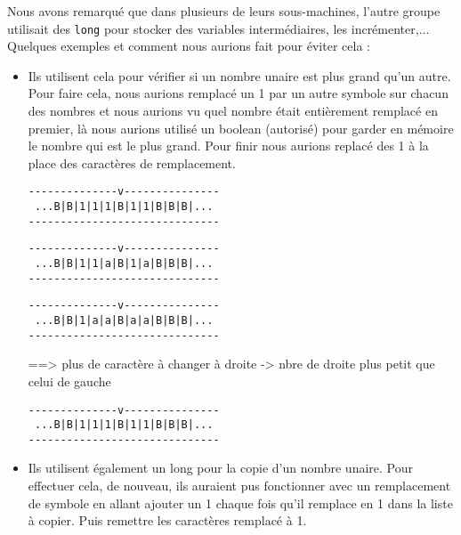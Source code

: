 \documentclass[a4paper,11pt]{article}
\begin{document}
Nous avons remarqué que dans plusieurs de leurs sous-machines, l'autre groupe utilisait des \texttt{long} pour stocker des variables intermédiaires, les incrémenter,...
Quelques exemples et comment nous aurions fait pour éviter cela :
\begin{itemize}
\item Ils utilisent cela pour vérifier si un nombre unaire est plus grand qu'un autre. Pour faire cela, nous aurions remplacé un 1 par un autre symbole sur chacun des nombres et nous aurions vu quel nombre était entièrement remplacé en premier, là nous aurions utilisé un boolean (autorisé) pour garder en mémoire le nombre qui est le plus grand. Pour finir nous aurions replacé des 1 à la place des caractères de remplacement.
\begin{verbatim}
--------------v---------------
 ...B|B|1|1|1|B|1|1|B|B|B|...
------------------------------
\end{verbatim}
\begin{verbatim}
--------------v---------------
 ...B|B|1|1|a|B|1|a|B|B|B|...
------------------------------
\end{verbatim}
\begin{verbatim}
--------------v---------------
 ...B|B|1|a|a|B|a|a|B|B|B|...
------------------------------
\end{verbatim}
==> plus de caractère à changer à droite -> nbre de droite plus petit que celui de gauche
\begin{verbatim}
--------------v---------------
 ...B|B|1|1|1|B|1|1|B|B|B|...
------------------------------
\end{verbatim}
\item Ils utilisent également un long pour la copie d'un nombre unaire. Pour effectuer cela, de nouveau, ils auraient pus fonctionner avec un remplacement de symbole en allant ajouter un 1 chaque fois qu'il remplace en 1 dans la liste à copier. Puis remettre les caractères remplacé à 1.
\end{itemize}
\end{document}
